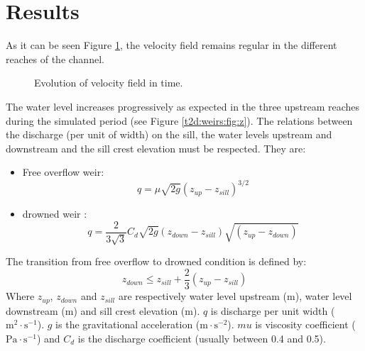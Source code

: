 \section{Results}

As it can be seen Figure \ref{t2d:weirs:velocity},
the velocity field remains regular in the different reaches of the channel.

\begin{figure}[!htbp]
\begin{minipage}[t]{0.50\textwidth}
 \centering
\end{minipage}%
\begin{minipage}[t]{0.50\textwidth}
 \centering
\end{minipage}
\begin{minipage}[t]{0.50\textwidth}
 \centering
\end{minipage}%
\begin{minipage}[t]{0.50\textwidth}
 \centering
\end{minipage}
 \caption{Evolution of velocity field in time.}
 \label{t2d:weirs:velocity}
\end{figure}

The water level increases progressively as expected
in the three upstream reaches during the simulated period
(see Figure \ref{t2d:weirs:fig:z}). The relations between
the discharge (per unit of width) on the sill, the water levels
upstream and downstream and the sill crest elevation must be respected.
They are:
\begin{itemize}
\item Free overflow weir:
\begin{equation*}
q=\mu \sqrt{2g}\left( z_{up}-z_{sill} \right)^{3/2}
\end{equation*}
\item drowned weir :
 	\begin{equation*}
q=\frac{2}{3\sqrt{3}}C_{d} \sqrt{2g}\left( z_{down}-z_{sill} \right)\sqrt{\left( z_{up}-z_{down} \right)}
\end{equation*}
\end{itemize}
The transition from free overflow to drowned condition is defined by:
\begin{equation}
  	z_{down} \leq z_{sill}+ \frac{2}{3}\left( z_{up}-z_{sill} \right)
  	\label{t2d:weirs:eq:1}
\end{equation}
Where $z_{up}$, $z_{down}$ and $z_{sill}$ are respectively
water level upstream (m), water level downstream (m) and
sill crest elevation (m).  $q$ is discharge per unit width
($\text{m}^2\cdot\text{s}^{-1}$). $g$ is the gravitational acceleration ($\text{m}\cdot\text{s}^{-2}$). $mu$ is viscosity coefficient ( $\text{Pa}\cdot\text{s}^{-1}$) and $C_{d}$ is the discharge coefficient
(usually between 0.4 and 0.5).

